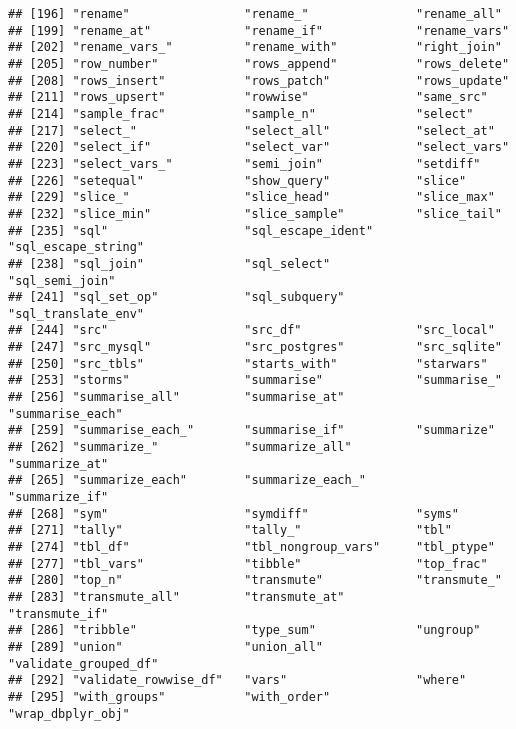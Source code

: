\documentclass[
]{book}
\begin{document}
\begin{verbatim}
## [196] "rename"                "rename_"               "rename_all"           
## [199] "rename_at"             "rename_if"             "rename_vars"          
## [202] "rename_vars_"          "rename_with"           "right_join"           
## [205] "row_number"            "rows_append"           "rows_delete"          
## [208] "rows_insert"           "rows_patch"            "rows_update"          
## [211] "rows_upsert"           "rowwise"               "same_src"             
## [214] "sample_frac"           "sample_n"              "select"               
## [217] "select_"               "select_all"            "select_at"            
## [220] "select_if"             "select_var"            "select_vars"          
## [223] "select_vars_"          "semi_join"             "setdiff"              
## [226] "setequal"              "show_query"            "slice"                
## [229] "slice_"                "slice_head"            "slice_max"            
## [232] "slice_min"             "slice_sample"          "slice_tail"           
## [235] "sql"                   "sql_escape_ident"      "sql_escape_string"    
## [238] "sql_join"              "sql_select"            "sql_semi_join"        
## [241] "sql_set_op"            "sql_subquery"          "sql_translate_env"    
## [244] "src"                   "src_df"                "src_local"            
## [247] "src_mysql"             "src_postgres"          "src_sqlite"           
## [250] "src_tbls"              "starts_with"           "starwars"             
## [253] "storms"                "summarise"             "summarise_"           
## [256] "summarise_all"         "summarise_at"          "summarise_each"       
## [259] "summarise_each_"       "summarise_if"          "summarize"            
## [262] "summarize_"            "summarize_all"         "summarize_at"         
## [265] "summarize_each"        "summarize_each_"       "summarize_if"         
## [268] "sym"                   "symdiff"               "syms"                 
## [271] "tally"                 "tally_"                "tbl"                  
## [274] "tbl_df"                "tbl_nongroup_vars"     "tbl_ptype"            
## [277] "tbl_vars"              "tibble"                "top_frac"             
## [280] "top_n"                 "transmute"             "transmute_"           
## [283] "transmute_all"         "transmute_at"          "transmute_if"         
## [286] "tribble"               "type_sum"              "ungroup"              
## [289] "union"                 "union_all"             "validate_grouped_df"  
## [292] "validate_rowwise_df"   "vars"                  "where"                
## [295] "with_groups"           "with_order"            "wrap_dbplyr_obj"
\end{verbatim}
\end{document}

